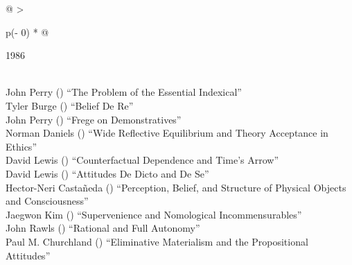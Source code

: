 \documentclass[
  10pt,
  letterpaper,
  DIV=11,
  numbers=noendperiod,
  twoside]{scrartcl}
\begin{document}
\begin{longtable}[]{@{}
  >{\raggedright\arraybackslash}p{(\columnwidth - 0\tabcolsep) * }@{}}

\caption{\label{tbl-top-ten-1977}Most cited articles published less than
ten years ago as of 1986.}

\tabularnewline

\toprule\noalign{}
\begin{minipage}[b]{\linewidth}\raggedright
1986
\end{minipage} \\
\midrule\noalign{}
\endhead
\bottomrule\noalign{}
\endlastfoot
John Perry
()
``The Problem of the Essential Indexical'' \\
Tyler Burge
()
``Belief De Re'' \\
John Perry
()
``Frege on Demonstratives'' \\
Norman Daniels
()
``Wide Reflective Equilibrium and Theory Acceptance in Ethics'' \\
David Lewis
()
``Counterfactual Dependence and Time's Arrow'' \\
David Lewis
()
``Attitudes De Dicto and De Se'' \\
Hector-Neri Castañeda
()
``Perception, Belief, and Structure of Physical Objects and
Consciousness'' \\
Jaegwon Kim
()
``Supervenience and Nomological Incommensurables'' \\
John Rawls
()
``Rational and Full Autonomy'' \\
Paul M. Churchland
()
``Eliminative Materialism and the Propositional Attitudes'' \\

\end{longtable}
\end{document}
